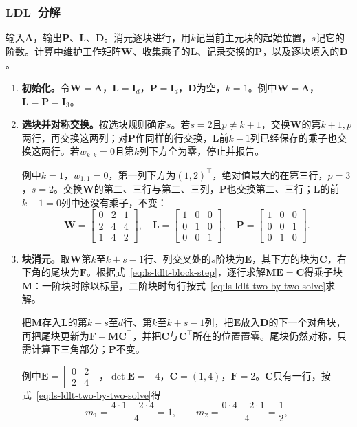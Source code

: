 \subsubsection{\texorpdfstring{$\bm L\bm D\bm L^\top$}{LDLT}分解}
输入$\bm A$，输出$\bm P$、$\bm L$、$\bm D$。消元逐块进行，用$k$记当前主元块的起始位置，$s$记它的阶数。计算中维护工作矩阵$\bm W$、收集乘子的$\bm L$、记录交换的$\bm P$，以及逐块填入的$\bm D$。
\begin{enumerate}
 \item \textbf{初始化。}令$\bm W=\bm A$，$\bm L=\bm I_d$，$\bm P=\bm I_d$，$\bm D$为空，$k=1$。例中$\bm W=\bm A$，$\bm L=\bm P=\bm I_3$。

 \item \textbf{选块并对称交换。}按选块规则确定$s$。若$s=2$且$p\neq k+1$，交换$\bm W$的第$k+1,p$两行，再交换这两列；对$\bm P$作同样的行交换，$\bm L$前$k-1$列已经保存的乘子也交换这两行。若$w_{k,k}=0$且第$k$列下方全为零，停止并报告。

 例中$k=1$，$w_{1,1}=0$，第一列下方为$(1,2)^\top$，绝对值最大的在第三行，$p=3$，$s=2$。交换$\bm W$的第二、三行与第二、三列，$\bm P$也交换第二、三行；$\bm L$的前$k-1=0$列中还没有乘子，不变：
 \[
  \bm W=\begin{bmatrix}0&2&1\\2&4&4\\1&4&2\end{bmatrix},\quad
  \bm L=\begin{bmatrix}1&0&0\\0&1&0\\0&0&1\end{bmatrix},\quad
  \bm P=\begin{bmatrix}1&0&0\\0&0&1\\0&1&0\end{bmatrix}.
 \]

 \item \textbf{块消元。}取$\bm W$第$k$至$k+s-1$行、列交叉处的$s$阶块为$\bm E$，其下方的块为$\bm C$，右下角的尾块为$\bm F$。根据式~\eqref{eq:ls-ldlt-block-step}，逐行求解$\bm M\bm E=\bm C$得乘子块$\bm M$：一阶块时除以标量，二阶块时每行按式~\eqref{eq:ls-ldlt-two-by-two-solve}求解。
 
 把$\bm M$存入$\bm L$的第$k+s$至$d$行、第$k$至$k+s-1$列，把$\bm E$放入$\bm D$的下一个对角块，再把尾块更新为$\bm F-\bm M\bm C^\top$，并把$\bm C$与$\bm C^\top$所在的位置置零。尾块仍然对称，只需计算下三角部分；$\bm P$不变。

 例中$\bm E=\left[\begin{smallmatrix}0&2\\2&4\end{smallmatrix}\right]$，$\det\bm E=-4$，$\bm C=(1,4)$，$\bm F=2$。$\bm C$只有一行，按式~\eqref{eq:ls-ldlt-two-by-two-solve}得
 \[
  m_1=\frac{4\cdot1-2\cdot4}{-4}=1,\qquad
  m_2=\frac{0\cdot4-2\cdot1}{-4}=\frac12 ,
 \]
 

\end{enumerate}
